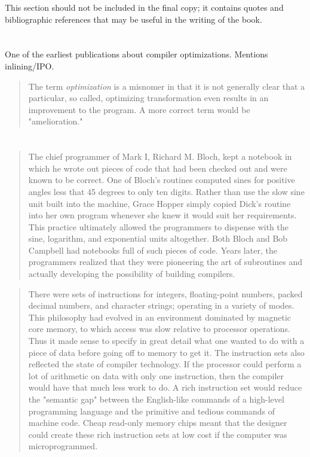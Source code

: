 
This section should not be included in the final copy;
it contains quotes and bibliographic references that may be useful in the writing of the book.

\vspace{1em}

\section{}

One of the earliest publications about compiler optimizations. Mentions inlining/IPO.

\begin{quotation}
The term \textit{optimization} is a misnomer in that it is not generally clear that a particular, so called, optimizing transformation even results in an improvement to the program. A more correct term would be "amelioration."
\end{quotation}

\section{}

\begin{quotation}
The chief programmer of Mark I, Richard M. Bloch, kept a notebook in which he wrote out pieces of code
that had been checked out and were known to be correct. One of Bloch's routines computed sines for
positive angles less that 45 degrees to only ten digits. Rather than use the slow sine unit built into the
machine, Grace Hopper simply copied Dick's routine into her own program whenever she knew it would suit
her requirements. This practice ultimately allowed the programmers to dispense with the sine, logarithm, and
exponential units altogether. Both Bloch and Bob Campbell had notebooks full of such pieces of code. Years
later, the programmers realized that they were pioneering the art of subroutines and actually developing the
possibility of building compilers.
\end{quotation}

\begin{quotation}
There were sets of instructions for integers, floating-point numbers, packed decimal numbers, and character
strings; operating in a variety of modes. This philosophy had evolved in an environment dominated by
magnetic core memory, to which access was slow relative to processor operations. Thus it made sense to
specify in great detail what one wanted to do with a piece of data before going off to memory to get it. The
instruction sets also reflected the state of compiler technology. If the processor could perform a lot of
arithmetic on data with only one instruction, then the compiler would have that much less work to do. A rich
instruction set would reduce the "semantic gap" between the English-like commands of a high-level
programming language and the primitive and tedious commands of machine code. Cheap read-only memory
chips meant that the designer could create these rich instruction sets at low cost if the computer was microprogrammed.
\end{quotation}

